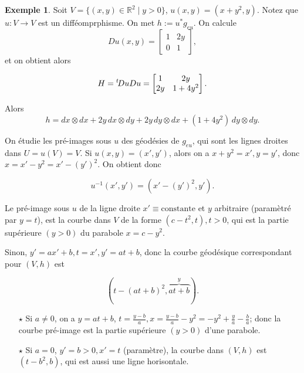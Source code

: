 \documentclass[french]{article}
\theoremstyle{definition}
\newtheorem{protoexemple}{Exemple}[section]
\newenvironment{exemple}
    {\colorlet{shadecolor}{gray!10}\begin{shaded}\begin{protoexemple}}
    {\end{protoexemple}\end{shaded}}
\newcommand{\biggg}{>}
\newcommand{\bg}{\biggg}
\begin{document}
\begin{exemple}
  Soit \(V = \{ (x,y) \in \mathbb{R}^2 \mid y \bg 0 \}\), \(u(x,y) = (x + y ^2, y)\). Notez que $u:V\to V$ est un diff\'eomprphisme. On met $h:= u^*g_{eu}$.  On  calcule \[Du (x,y)= \begin{bmatrix}
    1 & 2 y \\
    0 & 1
  \end{bmatrix},\] et on  obtient alors

  \begin{gather*}
    H = \prescript{t}{} \!Du Du = \begin{bmatrix}
      1 & 2y \\
      2 y & 1 + 4y ^2
  \end{bmatrix}.
\end{gather*}

  Alors \[h = dx \otimes dx + 2 y \,dx \otimes dy + 2 y\, dy \otimes dx + (1+ 4y ^2)\, dy \otimes dy.\]


On \'etudie les pr\'e-images sous $u$ des g\'eod\'esies de $g_{eu}$, qui sont les lignes droites dans $U=u(V)= V$.
  Si \(u(x,y) = (x', y')\), alors on a \(x+ y ^2 = x', y=y'\), donc \(x = x' - y ^2 = x' - (y')^2\). On obtient donc

  \[u ^{-1}(x',y') = (x' - (y')^2,y').\]

 Le pr\'e-image sous $u$ de la ligne droite \(x' \equiv \text{constante}\) et \(y\) arbitraire (paramètr\'e par  \(y=t\)), est la courbe dans \(V\) de la forme \((c -t ^2, t), t \bg 0\), qui est la partie sup\'erieure \((y>0)\) du parabole \(x= c-y^2\).



  Sinon, \(y' = ax'+b, t=x', y'=at+b\), donc la courbe géodésique correspondant pour \((V,h)\) est

  \[(t -(at+b)^2, \overbrace{at+b}^{y} ).\]

  \begin{itemize}
    \item [$\star$] Si \(a \neq 0\), on  a \(y = at+b\), \(t = \displaystyle\frac{y-b}{a}, x = \displaystyle\frac{y-b}{a} - y ^2 = -y ^2+ \displaystyle\frac{y}{a} - \displaystyle\frac{b}{a}\); donc la courbe pr\'e-image est la partie sup\'erieure \((y>0)\) d'une parabole.
    \item [$\star$] Si \(a= 0\), \(y'=  b \bg 0, x' = t\) (paramètre), la courbe dans \((V,h)\) est \((t-b^2,b)\), qui est aussi une ligne horisontale.
  \end{itemize}
\end{exemple}
\end{document}
